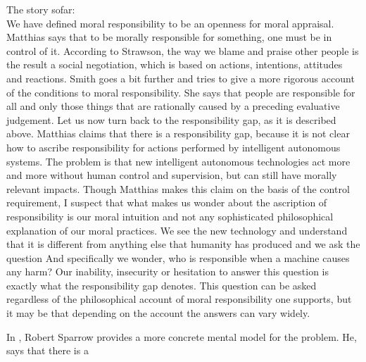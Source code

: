 \documentclass{article}
\begin{document}
The story sofar:\\
We have defined moral responsibility to be an openness for moral appraisal.
Matthias says that to be morally responsible for something, one must be in
control of it. According to Strawson, the way we blame and praise other people
is the result a social negotiation, which is based on actions, intentions, attitudes and
reactions. Smith goes a bit further and tries to give a more rigorous account of
the conditions to moral responsibility. She says that people are responsible for
all and only those things that are rationally caused by a preceding evaluative
judgement. Let us now turn back to the responsibility gap, as it is described
above. Matthias claims that there is a responsibility gap, because it is not
clear how to ascribe responsibility for actions performed by intelligent
autonomous systems. The problem is that new intelligent autonomous technologies
act more and more without human control and supervision, but can still have
morally relevant impacts. Though Matthias makes this claim on the basis of the
control requirement, I suspect that what makes us wonder about the
ascription of responsibility is our moral intuition and not any sophisticated
philosophical explanation of our moral practices. We see the new technology and
understand that it is different from anything else that humanity has produced
and we ask the question  And specifically we
wonder, who is responsible when a machine causes any harm?
Our inability, insecurity or hesitation to answer this question is exactly what
the responsibility gap denotes.
This question can be asked regardless of the philosophical account of moral
responsibility one supports, but it may be that depending on the account the
answers can vary widely.

In , Robert Sparrow provides a more concrete mental model for
the problem. He, says that there is a 
\end{document}
